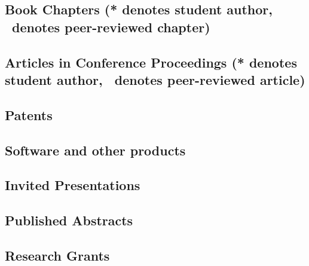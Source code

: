 \documentclass[10pt]{article}
\begin{document}
    \subsection[Book Chapters]{Book Chapters (* denotes student author, \peerrevmark\ denotes peer-reviewed chapter)}
    \begin{refsection}
        \nocite{*}
        \printbibliography[heading=none,type=incollection]
    \end{refsection}
	\subsection[Articles in Conference Proceedings]{Articles in Conference Proceedings (* denotes student author, \peerrevmark\ denotes peer-reviewed article)}
    \begin{refsection}
        \nocite{*}
        \printbibliography[heading=none,type=inproceedings]
    \end{refsection}
  \subsection{Patents}
    \begin{refsection}
        \nocite{*}
        \printbibliography[heading=none,type=patent]
       \end{refsection}
  \subsection{Software and other products}
	
	\subsection{Invited Presentations}
    \begin{enumerate}
    
    
    \end{enumerate}
	\subsection{Published Abstracts}
    \begin{enumerate}
    
    
    \end{enumerate}
	\subsection{Research Grants}
	
\iffalse
\end{document}
